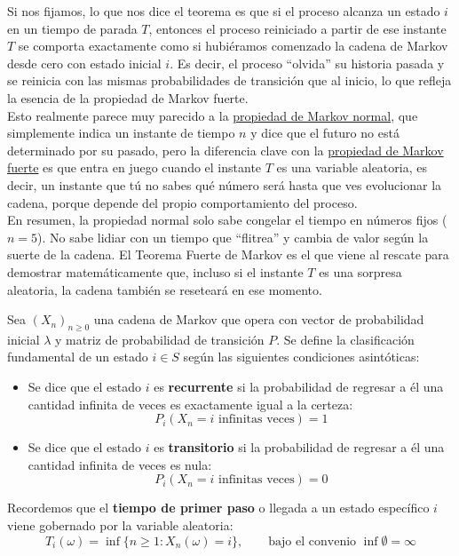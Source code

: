 \begin{observacion}
    Si nos fijamos, lo que  nos dice el teorema es que si el proceso alcanza un estado $i$ en un tiempo de parada $T$, entonces el proceso reiniciado a partir de ese instante $T$ se comporta exactamente como si hubiéramos comenzado la cadena de Markov desde cero con estado inicial $i$. Es decir, el proceso ``olvida'' su historia pasada y se reinicia con las mismas probabilidades de transición que al inicio, lo que refleja la esencia de la propiedad de Markov fuerte. \\

    \noindent
    Esto realmente parece muy parecido a la \underline{propiedad de Markov normal}, que simplemente indica un instante de tiempo $n$ y dice que el futuro no está determinado por su pasado, pero la diferencia clave con la \underline{propiedad de Markov fuerte} es que entra en juego cuando el instante $T$ es una variable aleatoria, es decir, un instante que tú no sabes qué número será hasta que ves evolucionar la cadena, porque depende del propio comportamiento del proceso. \\

    \noindent
    En resumen, la propiedad normal solo sabe congelar el tiempo en números fijos ($n=5$). No sabe lidiar con un tiempo que ``flitrea'' y cambia de valor según la suerte de la cadena. El Teorema Fuerte de Markov es el que viene al rescate para demostrar matemáticamente que, incluso si el instante $T$ es una sorpresa aleatoria, la cadena también se reseteará en ese momento.
\end{observacion}


\begin{definicion}
Sea $(X_n)_{n \geq 0}$ una cadena de Markov que opera con vector de probabilidad inicial $\lambda$ y matriz de probabilidad de transición $P$. Se define la clasificación fundamental de un estado $i \in S$ según las siguientes condiciones asintóticas:
\begin{itemize}
    \item Se dice que el estado $i$ es \textbf{recurrente} si la probabilidad de regresar a él una cantidad infinita de veces es exactamente igual a la certeza:
    \[
    P_i(X_n = i \text{ infinitas veces}) = 1
    \]
    \item Se dice que el estado $i$ es \textbf{transitorio} si la probabilidad de regresar a él una cantidad infinita de veces es nula:
    \[
    P_i(X_n = i \text{ infinitas veces}) = 0
    \]
\end{itemize}

\end{definicion}
\noindent
Recordemos que el \textbf{tiempo de primer paso} o llegada a un estado específico $i$ viene gobernado por la variable aleatoria: 
\[
T_i(\omega) = \inf\{n \geq 1 : X_n(\omega) = i\}, \qquad \text{bajo el convenio } \inf \emptyset = \infty
\]

